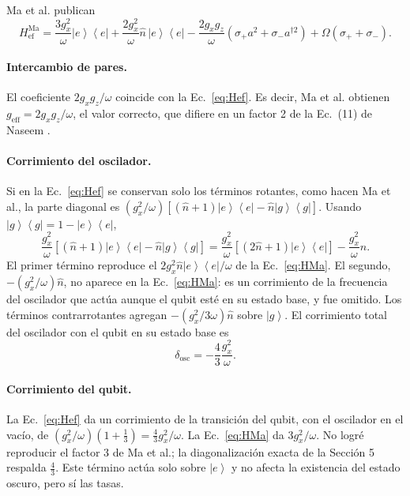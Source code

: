 \documentclass[11pt]{report}
\newcommand{\ket}[1]{\left|#1\right\rangle}
\newcommand{\bra}[1]{\left\langle#1\right|}
\newcommand{\spl}{\sigma_{+}}
\newcommand{\smi}{\sigma_{-}}
\newcommand{\Pe}{\ket{e}\!\bra{e}}
\newcommand{\Pg}{\ket{g}\!\bra{g}}
\begin{document}
Ma et al. publican
\begin{equation}
H_{\mathrm{ef}}^{\mathrm{Ma}} = \frac{3g_{x}^{2}}{\omega}\Pe + \frac{2g_{x}^{2}}{\omega}\hat n\,\Pe - \frac{2g_{x}g_{z}}{\omega}\left(\spl a^{2}+\smi a^{\dagger 2}\right) + \Omega(\spl+\smi).
\label{eq:HMa}
\end{equation}

\paragraph{Intercambio de pares.} El coeficiente $2g_{x}g_{z}/\omega$ coincide con la Ec.~\eqref{eq:Hef}. Es decir, Ma et al. obtienen $g_{\mathrm{eff}}=2g_{x}g_{z}/\omega$, el valor correcto, que difiere en un factor 2 de la Ec.~(11) de Naseem \cite{Naseem2026}.

\paragraph{Corrimiento del oscilador.} Si en la Ec.~\eqref{eq:Hef} se conservan solo los t\'erminos rotantes, como hacen Ma et al., la parte diagonal es $(g_{x}^{2}/\omega)[(\hat n+1)\Pe-\hat n\Pg]$. Usando $\Pg=1-\Pe$,
\begin{equation}
\frac{g_{x}^{2}}{\omega}\left[(\hat n+1)\Pe-\hat n\Pg\right] = \frac{g_{x}^{2}}{\omega}\left[(2\hat n+1)\Pe\right] - \frac{g_{x}^{2}}{\omega}\hat n .
\end{equation}
El primer t\'ermino reproduce el $2g_{x}^{2}\hat n\Pe/\omega$ de la Ec.~\eqref{eq:HMa}. El segundo, $-(g_{x}^{2}/\omega)\hat n$, no aparece en la Ec.~\eqref{eq:HMa}: es un corrimiento de la frecuencia del oscilador que act\'ua aunque el qubit est\'e en su estado base, y fue omitido. Los t\'erminos contrarrotantes agregan $-(g_{x}^{2}/3\omega)\hat n$ sobre $\ket{g}$. El corrimiento total del oscilador con el qubit en su estado base es
\begin{equation}
\boxed{\delta_{\mathrm{osc}} = -\frac{4}{3}\frac{g_{x}^{2}}{\omega}}.
\label{eq:dosc}
\end{equation}

\paragraph{Corrimiento del qubit.} La Ec.~\eqref{eq:Hef} da un corrimiento de la transici\'on del qubit, con el oscilador en el vac\'io, de $(g_{x}^{2}/\omega)(1+\tfrac{1}{3})=\tfrac{4}{3}g_{x}^{2}/\omega$. La Ec.~\eqref{eq:HMa} da $3g_{x}^{2}/\omega$. No logr\'e reproducir el factor 3 de Ma et al.; la diagonalizaci\'on exacta de la Secci\'on 5 respalda $\tfrac{4}{3}$. Este t\'ermino act\'ua solo sobre $\ket{e}$ y no afecta la existencia del estado oscuro, pero s\'i las tasas.
\end{document}
